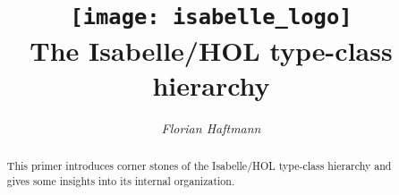 \documentclass[12pt,a4paper,fleqn]{article}
\title{\texttt{[image: isabelle\_logo]}
  \\[4ex] The {Isabelle/HOL} type-class hierarchy}
\author{\emph{Florian Haftmann}}
\begin{document}
\maketitle

\begin{abstract}
  \noindent This primer introduces corner stones of the {Isabelle/HOL}
  type-class hierarchy and gives some insights into its internal
  organization.
\end{abstract}

\thispagestyle{empty}\clearpage

\clearfirst



\begingroup
 \small\raggedright\frenchspacing

\endgroup
\end{document}
